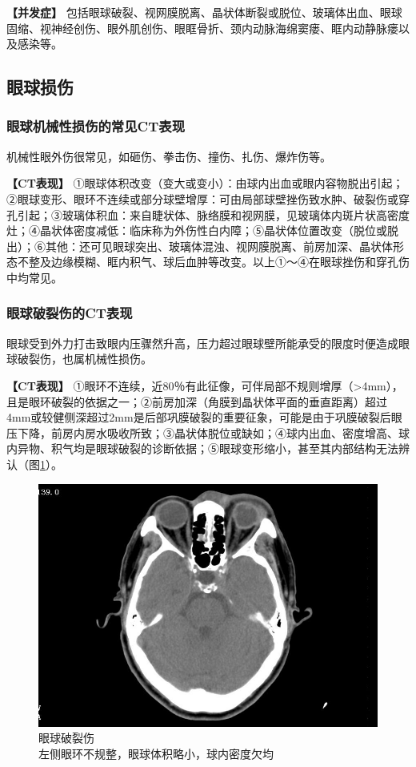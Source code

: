 \textbf{【并发症】}
包括眼球破裂、视网膜脱离、晶状体断裂或脱位、玻璃体出血、眼球固缩、视神经创伤、眼外肌创伤、眼眶骨折、颈内动脉海绵窦瘘、眶内动静脉瘘以及感染等。

\subsection{眼球损伤}

\subsubsection{眼球机械性损伤的常见CT表现}

机械性眼外伤很常见，如砸伤、拳击伤、撞伤、扎伤、爆炸伤等。

\textbf{【CT表现】}
①眼球体积改变（变大或变小）：由球内出血或眼内容物脱出引起；②眼球变形、眼环不连续或部分球壁增厚：可由局部球壁挫伤致水肿、破裂伤或穿孔引起；③玻璃体积血：来自睫状体、脉络膜和视网膜，见玻璃体内斑片状高密度灶；④晶状体密度减低：临床称为外伤性白内障；⑤晶状体位置改变（脱位或脱出）；⑥其他：还可见眼球突出、玻璃体混浊、视网膜脱离、前房加深、晶状体形态不整及边缘模糊、眶内积气、球后血肿等改变。以上①～④在眼球挫伤和穿孔伤中均常见。

\subsubsection{眼球破裂伤的CT表现}

眼球受到外力打击致眼内压骤然升高，压力超过眼球壁所能承受的限度时便造成眼球破裂伤，也属机械性损伤。

\textbf{【CT表现】}
①眼环不连续，近80％有此征像，可伴局部不规则增厚（\textgreater{}4mm），且是眼环破裂的依据之一；②前房加深（角膜到晶状体平面的垂直距离）超过4mm或较健侧深超过2mm是后部巩膜破裂的重要征象，可能是由于巩膜破裂后眼压下降，前房内房水吸收所致；③晶状体脱位或缺如；④球内出血、密度增高、球内异物、积气均是眼球破裂的诊断依据；⑤眼球变形缩小，甚至其内部结构无法辨认（图\ref{fig3-3}）。

\begin{figure}[!htbp]
 \centering
 \includegraphics[width=.7\textwidth,height=\textheight,keepaspectratio]{./images/Image00098.jpg}
 \captionsetup{justification=centering}
 \caption{眼球破裂伤\\{\small 左侧眼环不规整，眼球体积略小，球内密度欠均}}
 \label{fig3-3}
  \end{figure} 

